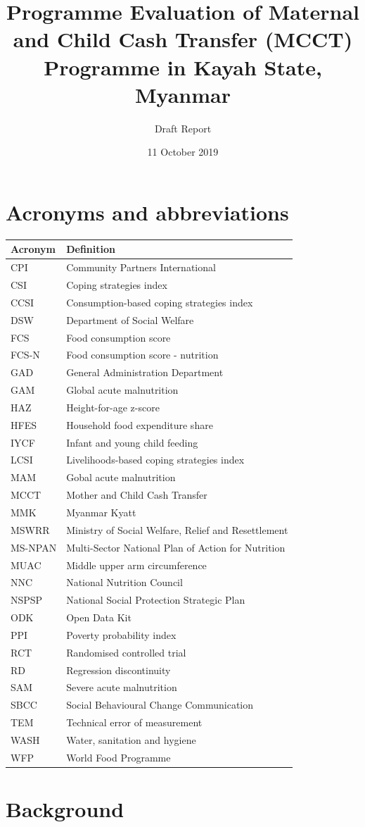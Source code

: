 \documentclass[12pt,a4paper]{article}
\title{\vspace{8cm} \LARGE{Programme Evaluation of Maternal and Child Cash Transfer (MCCT) Programme in Kayah State, Myanmar}}
\subtitle{Draft Report}
\author{}
\date{11 October 2019}
\begin{document}
\maketitle

\newpage

{
\hypersetup{linkcolor=black}
\setcounter{tocdepth}{3}
\tableofcontents
}
\listoftables
\listoffigures
\newpage

\hypertarget{acronyms-and-abbreviations}{%
\section*{Acronyms and abbreviations}\label{acronyms-and-abbreviations}}

\begin{longtable}[]{@{}ll@{}}
\toprule
Acronym & Definition\tabularnewline
\midrule
\endhead
CPI & Community Partners International\tabularnewline
CSI & Coping strategies index\tabularnewline
CCSI & Consumption-based coping strategies index\tabularnewline
DSW & Department of Social Welfare\tabularnewline
FCS & Food consumption score\tabularnewline
FCS-N & Food consumption score - nutrition\tabularnewline
GAD & General Administration Department\tabularnewline
GAM & Global acute malnutrition\tabularnewline
HAZ & Height-for-age z-score\tabularnewline
HFES & Household food expenditure share\tabularnewline
IYCF & Infant and young child feeding\tabularnewline
LCSI & Livelihoods-based coping strategies index\tabularnewline
MAM & Gobal acute malnutrition\tabularnewline
MCCT & Mother and Child Cash Transfer\tabularnewline
MMK & Myanmar Kyatt\tabularnewline
MSWRR & Ministry of Social Welfare, Relief and Resettlement\tabularnewline
MS-NPAN & Multi-Sector National Plan of Action for Nutrition\tabularnewline
MUAC & Middle upper arm circumference\tabularnewline
NNC & National Nutrition Council\tabularnewline
NSPSP & National Social Protection Strategic Plan\tabularnewline
ODK & Open Data Kit\tabularnewline
PPI & Poverty probability index\tabularnewline
RCT & Randomised controlled trial\tabularnewline
RD & Regression discontinuity\tabularnewline
SAM & Severe acute malnutrition\tabularnewline
SBCC & Social Behavioural Change Communication\tabularnewline
TEM & Technical error of measurement\tabularnewline
WASH & Water, sanitation and hygiene\tabularnewline
WFP & World Food Programme\tabularnewline
\bottomrule
\end{longtable}

\newpage

\hypertarget{background}{%
\section{Background}\label{background}}
\end{document}
